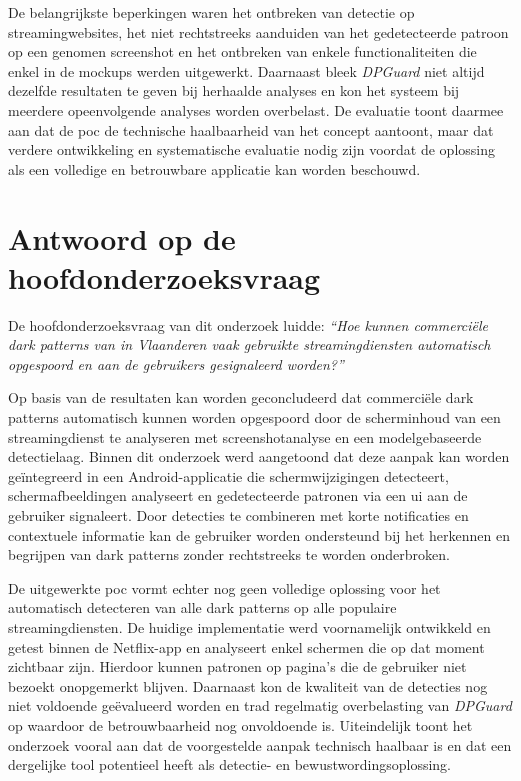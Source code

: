\vspace{1em}

De belangrijkste beperkingen waren het ontbreken van detectie op streamingwebsites, het niet rechtstreeks aanduiden van het gedetecteerde patroon op een genomen screenshot en het ontbreken van enkele functionaliteiten die enkel in de mockups werden uitgewerkt. Daarnaast bleek \textit{DPGuard} niet altijd dezelfde resultaten te geven bij herhaalde analyses en kon het systeem bij meerdere opeenvolgende analyses worden overbelast. De evaluatie toont daarmee aan dat de \acrshort{poc} de technische haalbaarheid van het concept aantoont, maar dat verdere ontwikkeling en systematische evaluatie nodig zijn voordat de oplossing als een volledige en betrouwbare applicatie kan worden beschouwd.

\vspace{1em}

\section{Antwoord op de hoofdonderzoeksvraag}
\label{sec:antwoord-hoofdonderzoeksvraag}

\vspace{1em}

De hoofdonderzoeksvraag van dit onderzoek luidde: \emph{``Hoe kunnen commerciële dark patterns van in Vlaanderen vaak gebruikte     streamingdiensten automatisch opgespoord en aan de gebruikers gesignaleerd worden?''}

\vspace{1em}

Op basis van de resultaten kan worden geconcludeerd dat commerciële dark patterns automatisch kunnen worden opgespoord door de scherminhoud van een streamingdienst te analyseren met screenshotanalyse en een modelgebaseerde detectielaag. Binnen dit onderzoek werd aangetoond dat deze aanpak kan worden geïntegreerd in een Android-applicatie die schermwijzigingen detecteert, schermafbeeldingen analyseert en gedetecteerde patronen via een \acrshort{ui} aan de gebruiker signaleert. Door detecties te combineren met korte notificaties en contextuele informatie kan de gebruiker worden ondersteund bij het herkennen en begrijpen van dark patterns zonder rechtstreeks te worden onderbroken.

\vspace{1em}

De uitgewerkte \acrshort{poc} vormt echter nog geen volledige oplossing voor het automatisch detecteren van alle dark patterns op alle populaire streamingdiensten. De huidige implementatie werd voornamelijk ontwikkeld en getest binnen de Netflix-app en analyseert enkel schermen die op dat moment zichtbaar zijn. Hierdoor kunnen patronen op pagina's die de gebruiker niet bezoekt onopgemerkt blijven. Daarnaast kon de kwaliteit van de detecties nog niet voldoende geëvalueerd worden en trad regelmatig overbelasting van \textit{DPGuard} op waardoor de betrouwbaarheid nog onvoldoende is. Uiteindelijk toont het onderzoek vooral aan dat de voorgestelde aanpak technisch haalbaar is en dat een dergelijke tool potentieel heeft als detectie- en bewustwordingsoplossing.

